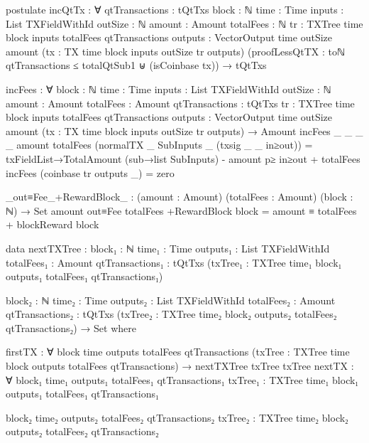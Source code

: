 \documentclass{beamer}
\begin{document}
\begin{code}
        postulate
          incQtTx : ∀ {qtTransactions : tQtTxs}
            {block : ℕ} {time : Time}
            {inputs : List TXFieldWithId}
            {outSize : ℕ} {amount : Amount}
            {totalFees : ℕ}
            {tr : TXTree time block inputs totalFees qtTransactions}
            {outputs : VectorOutput time outSize amount}
            (tx : TX {time} {block} {inputs} {outSize} tr outputs)
            (proofLessQtTX :
                toℕ qtTransactions ≤ totalQtSub1
                ⊎
                (isCoinbase tx))
            → tQtTxs

        incFees : ∀ {block : ℕ} {time : Time}
          {inputs : List TXFieldWithId}
          {outSize : ℕ} {amount : Amount}
          {totalFees : Amount} {qtTransactions : tQtTxs}
          {tr : TXTree time block inputs totalFees qtTransactions}
          {outputs : VectorOutput time outSize amount}
          (tx : TX {time} {block} {inputs} {outSize} tr outputs)
          → Amount
        incFees {_} {_} {_} {_} {amount} {totalFees}
          (normalTX _ SubInputs _ (txsig _ _ in≥out)) =
          txFieldList→TotalAmount (sub→list SubInputs)
          - amount p≥ in≥out
          + totalFees
        incFees (coinbase tr outputs _) = zero

        _out≡Fee_+RewardBlock_ : (amount : Amount)
          (totalFees : Amount)
          (block : ℕ) → Set
        amount out≡Fee totalFees +RewardBlock block =
          amount ≡ totalFees + blockReward block


      data nextTXTree :
        {block₁ : ℕ}
        {time₁ : Time}
        {outputs₁ : List TXFieldWithId}
        {totalFees₁ : Amount}
        {qtTransactions₁ : tQtTxs}
        (txTree₁ : TXTree time₁ block₁ outputs₁ totalFees₁ qtTransactions₁)

        {block₂ : ℕ}
        {time₂ : Time}
        {outputs₂ : List TXFieldWithId}
        {totalFees₂ : Amount}
        {qtTransactions₂ : tQtTxs}
        (txTree₂ : TXTree time₂ block₂ outputs₂ totalFees₂ qtTransactions₂)
        → Set where

        firstTX : ∀ {block time outputs totalFees qtTransactions}
          (txTree : TXTree time block outputs totalFees qtTransactions)
          → nextTXTree txTree txTree
        nextTX : ∀ {block₁ time₁ outputs₁ totalFees₁ qtTransactions₁}
          {txTree₁ : TXTree time₁ block₁ outputs₁ totalFees₁ qtTransactions₁}

          {block₂ time₂ outputs₂ totalFees₂ qtTransactions₂}
          {txTree₂ : TXTree time₂ block₂ outputs₂ totalFees₂ qtTransactions₂}


\end{code}
\end{document}
